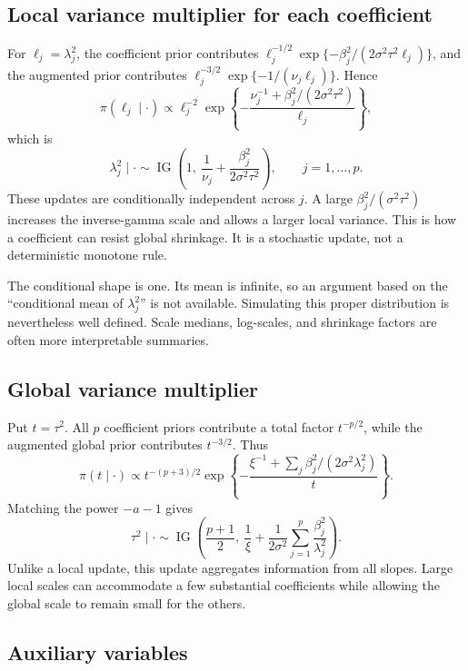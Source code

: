 \documentclass[11pt,letterpaper]{article}
\numberwithin{equation}{section}
\newcommand{\IG}{\operatorname{IG}}
\newcommand{\given}{\mid}
\begin{document}
\subsection{Local variance multiplier for each coefficient}

For \(\ell_j=\lambda_j^2\), the coefficient prior contributes
\(\ell_j^{-1/2}\exp\{-\beta_j^2/(2\sigma^2\tau^2\ell_j)\}\), and the
augmented prior contributes
\(\ell_j^{-3/2}\exp\{-1/(\nu_j\ell_j)\}\). Hence
\[
 \pi(\ell_j\given\cdot)\propto\ell_j^{-2}
 \exp\left\{-\frac{\nu_j^{-1}+\beta_j^2/(2\sigma^2\tau^2)}{\ell_j}\right\},
\]
which is
\begin{equation}\label{eq:lambda}
 \boxed{\lambda_j^2\given\cdot\sim
 \IG\left(1,\ \frac1{\nu_j}+\frac{\beta_j^2}{2\sigma^2\tau^2}\right),
 \qquad j=1,\ldots,p.}
\end{equation}
These updates are conditionally independent across \(j\). A large
\(\beta_j^2/(\sigma^2\tau^2)\) increases the inverse-gamma scale and allows
a larger local variance. This is how a coefficient can resist global
shrinkage. It is a stochastic update, not a deterministic monotone rule.

The conditional shape is one. Its mean is infinite, so an argument based on
the ``conditional mean of \(\lambda_j^2\)'' is not available. Simulating this
proper distribution is nevertheless well defined. Scale medians, log-scales,
and shrinkage factors are often more interpretable summaries.

\subsection{Global variance multiplier}

Put \(t=\tau^2\). All \(p\) coefficient priors contribute a total factor
\(t^{-p/2}\), while the augmented global prior contributes \(t^{-3/2}\).
Thus
\[
 \pi(t\given\cdot)\propto
 t^{-(p+3)/2}
 \exp\left\{-\frac{\xi^{-1}+
          \sum_j\beta_j^2/(2\sigma^2\lambda_j^2)}{t}\right\}.
\]
Matching the power \(-a-1\) gives
\begin{equation}\label{eq:tau}
 \boxed{\tau^2\given\cdot\sim
 \IG\left(\frac{p+1}{2},\ \frac1\xi+
           \frac1{2\sigma^2}\sum_{j=1}^p\frac{\beta_j^2}{\lambda_j^2}\right).}
\end{equation}
Unlike a local update, this update aggregates information from all slopes.
Large local scales can accommodate a few substantial coefficients while
allowing the global scale to remain small for the others.

\subsection{Auxiliary variables}
\end{document}
